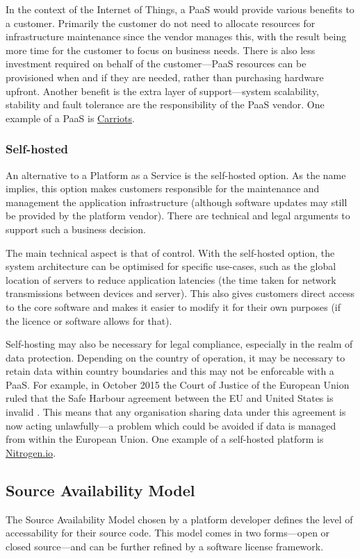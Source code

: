         In the context of the Internet of Things, a PaaS would provide various benefits to a customer. Primarily the customer do not need to allocate resources for infrastructure maintenance since the vendor manages this, with the result being more time for the customer to focus on business needs. There is also less investment required on behalf of the customer---PaaS resources can be provisioned when and if they are needed, rather than purchasing hardware upfront. Another benefit is the extra layer of support---system scalability, stability and fault tolerance are the responsibility of the PaaS vendor. One example of a PaaS is \href{https://www.carriots.com/}{Carriots}.

      \subsubsection{Self-hosted}
        An alternative to a Platform as a Service is the self-hosted option. As the name implies, this option makes customers responsible for the maintenance and management the application infrastructure (although software updates may still be provided by the platform vendor). There are technical and legal arguments to support such a business decision.

        The main technical aspect is that of control. With the self-hosted option, the system architecture can be optimised for specific use-cases, such as the global location of servers to reduce application latencies (the time taken for network transmissions between devices and server). This also gives customers direct access to the core software and makes it easier to modify it for their own purposes (if the licence or software allows for that).

        Self-hosting may also be necessary for legal compliance, especially in the realm of data protection. Depending on the country of operation, it may be necessary to retain data within country boundaries and this may not be enforcable with a PaaS. For example, in October 2015 the Court of Justice of the European Union ruled that the Safe Harbour agreement between the EU and United States is invalid \citep{C362/14}. This means that any organisation sharing data under this agreement is now acting unlawfully---a problem which could be avoided if data is managed from within the European Union. One example of a self-hosted platform is \href{http://nitrogen.io/}{Nitrogen.io}.

    \subsection{Source Availability Model}
      The Source Availability Model chosen by a platform developer defines the level of accessability for their source code. This model comes in two forms---open or closed source---and can be further refined by a software license framework.

